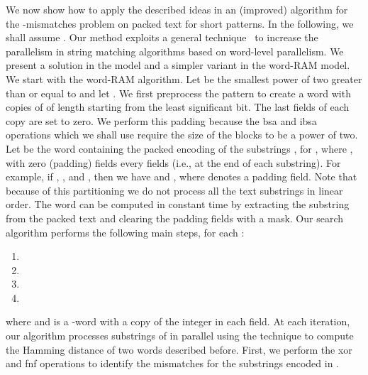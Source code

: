 \documentclass{llncs}
\def \bxor{\textsf{xor}\xspace}
\newcommand{\fsize}{f}
\newcommand{\fword}[1]{-word}
\begin{document}
We now show how to apply the described ideas in an (improved)
algorithm for the -mismatches problem on packed text for short
patterns. In the following, we shall assume . Our method
exploits a general technique~\cite{DBLP:journals/jea/HyyroFN05} to
increase the parallelism in string matching algorithms based on
word-level parallelism. We present a solution in the 
model and a simpler variant in the word-RAM model.
We start with the word-RAM algorithm.
Let  be the smallest power of two greater than
or equal to  and let . We
first preprocess the pattern  to create a word  with
 copies of  of length  starting from the
least significant bit. The last  fields of each copy are
set to zero. We perform this padding because the \textsf{bsa} and
\textsf{ibsa} operations which we shall use require the size of the
blocks to be a power of two. Let
 be the word containing the packed encoding of the
substrings , for
, where , with
 zero (padding) fields every  fields (i.e., at the end
of each substring). For example, if
, ,  and , then we have
 and , where  denotes a padding field.
Note that because of this partitioning we do not process all the text
substrings in linear order. The word  can be computed in constant
time by extracting the substring  from
the packed text and clearing the padding fields with a mask.
Our search algorithm performs the following main steps, for each :
\begin{enumerate}
\item 
\item 
\item 
\item 
\end{enumerate}
where  and  is a
\fword{\fsize} with a copy of the integer  in each field.
At each iteration, our algorithm processes 
substrings of  in parallel using the technique to compute the
Hamming distance of two words described before. First, we perform the
\bxor and \textsf{fnf} operations to identify the mismatches for the
 substrings encoded in .
\end{document}
